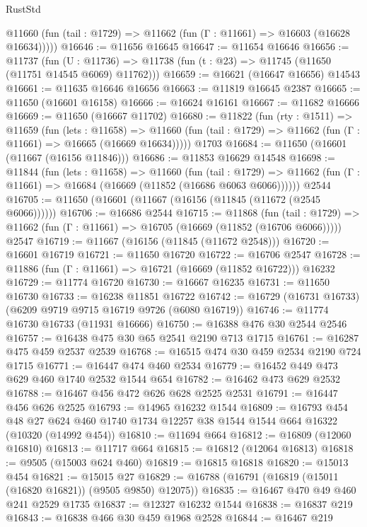 \begin{lexlean}{RustStd}
\begin{coremodule}
      @11660 (fun (tail : @1729) => @11662 (fun (Γ : @11661) => @16603 (@16628 @16634)))))
@16646 := @11656 @16645
@16647 := @11654 @16646
@16656 := @11737
    (fun (U : @11736) => @11738 (fun (t : @23) => @11745 (@11650 (@11751 @14545 @6069) @11762)))
@16659 := @16621 (@16647 @16656) @14543
@16661 := @11635 @16646 @16656
@16663 := @11819 @16645 @2387
@16665 := @11650 (@16601 @16158)
@16666 := @16624 @16161
@16667 := @11682 @16666
@16669 := @11650 (@16667 @11702)
@16680 := @11822
    (fun (rty : @1511) =>
    @11659
      (fun (lets : @11658) =>
      @11660 (fun (tail : @1729) => @11662 (fun (Γ : @11661) => @16665 (@16669 @16634)))))
    @1703
@16684 := @11650 (@16601 (@11667 (@16156 @11846)))
@16686 := @11853 @16629 @14548
@16698 := @11844
    (fun (lets : @11658) =>
    @11660
      (fun (tail : @1729) =>
      @11662 (fun (Γ : @11661) => @16684 (@16669 (@11852 (@16686 @6063 @6066))))))
    @2544
@16705 := @11650 (@16601 (@11667 (@16156 (@11845 (@11672 (@2545 @6066))))))
@16706 := @16686 @2544
@16715 := @11868
    (fun (tail : @1729) => @11662 (fun (Γ : @11661) => @16705 (@16669 (@11852 (@16706 @6066)))))
    @2547
@16719 := @11667 (@16156 (@11845 (@11672 @2548)))
@16720 := @16601 @16719
@16721 := @11650 @16720
@16722 := @16706 @2547
@16728 := @11886 (fun (Γ : @11661) => @16721 (@16669 (@11852 @16722))) @16232
@16729 := @11774 @16720
@16730 := @16667 @16235
@16731 := @11650 @16730
@16733 := @16238 @11851 @16722
@16742 := @16729 (@16731 @16733) (@6209 @9719 @9715 @16719 @9726 (@6080 @16719))
@16746 := @11774 @16730 @16733 (@11931 @16666)
@16750 := @16388 @476 @30 @2544 @2546
@16757 := @16438 @475 @30 @65 @2541 @2190 @713 @1715
@16761 := @16287 @475 @459 @2537 @2539
@16768 := @16515 @474 @30 @459 @2534 @2190 @724 @1715
@16771 := @16447 @474 @460 @2534
@16779 := @16452 @449 @473 @629 @460 @1740 @2532 @1544 @654
@16782 := @16462 @473 @629 @2532
@16788 := @16467 @456 @472 @626 @628 @2525 @2531
@16791 := @16447 @456 @626 @2525
@16793 := @14965 @16232 @1544
@16809 := @16793
    @454
    @48
    @27
    @624
    @460
    @1740
    @1734
    @12257
    @38
    @1544
    @1544
    @664
    @16322
    (@10320 (@14992 @454))
@16810 := @11694 @664
@16812 := @16809 (@12060 @16810)
@16813 := @11717 @664
@16815 := @16812 (@12064 @16813)
@16818 := @9505 (@15003 @624 @460)
@16819 := @16815 @16818
@16820 := @15013 @454
@16821 := @15015 @27
@16829 := @16788 (@16791 (@16819 (@15011 (@16820 @16821)) (@9505 @9850) @12075))
@16835 := @16467 @470 @49 @460 @241 @2529 @1735
@16837 := @12327 @16232 @1544
@16838 := @16837 @219
@16843 := @16838 @466 @30 @459 @1968 @2528
@16844 := @16467 @219

\end{coremodule}
\end{lexlean}

